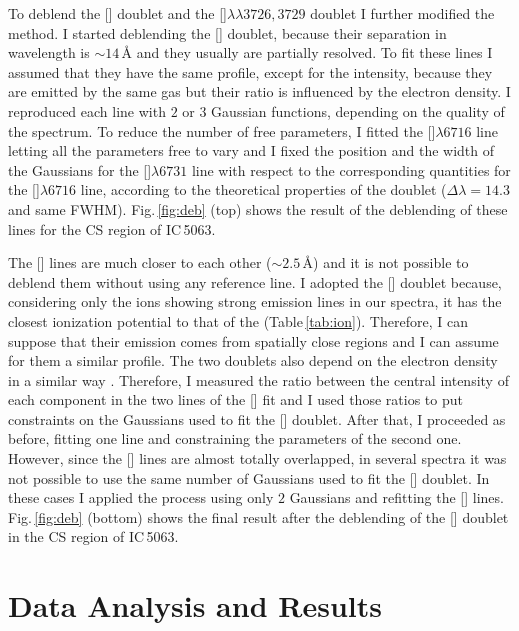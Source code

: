 \documentclass[../main.tex]{subfiles}
\begin{document}
To deblend the [] doublet and the []$\lambda\lambda3726,3729$ doublet I further modified the method.
I started deblending the [] doublet, because their separation in wavelength is $\sim 14\,\si{\angstrom}$ and they usually are partially resolved.
To fit these lines I assumed that they have the same profile, except for the intensity, because they are emitted by the same gas but their ratio is influenced by the electron density.
I reproduced each line with $2$ or $3$ Gaussian functions, depending on the quality of the spectrum.
To reduce the number of free parameters, I fitted the []$\lambda6716$ line letting all the parameters free to vary and I fixed the position and the width of the Gaussians for the []$\lambda6731$ line with respect to the corresponding quantities for the []$\lambda6716$ line, according to the theoretical properties of the doublet ($\Delta \lambda = 14.3$ and same FWHM).
Fig.\,\ref{fig:deb} (top) shows the result of the deblending of these lines for the CS region of IC\,5063.

The [] lines are much closer to each other ($\sim 2.5$\,\AA) and it is not possible to deblend them without using any reference line.
I adopted the [] doublet because, considering only the ions showing strong emission lines in our spectra, it has the closest ionization potential to that of the  (Table\,\ref{tab:ion}).
Therefore, I can suppose that their emission comes from spatially close regions and I can assume for them a similar profile.
The two doublets also depend on the electron density in a similar way \citep[see][]{OsterbrockAGN}.
Therefore, I measured the ratio between the central intensity of each component in the two lines of the [] fit and I used those ratios to put constraints on the Gaussians used to fit the [] doublet.
After that, I proceeded as before, fitting one line and constraining the parameters of the second one.
However, since the [] lines are almost totally overlapped, in several spectra it was not possible to use the same number of Gaussians used to fit the [] doublet.
In these cases I applied the process using only $2$ Gaussians and refitting the [] lines.
Fig.\,\ref{fig:deb} (bottom) shows the final result after the deblending of the [] doublet in the CS region of IC\,5063.


\section{Data Analysis and Results}
\label{sec:data_an}
\end{document}
